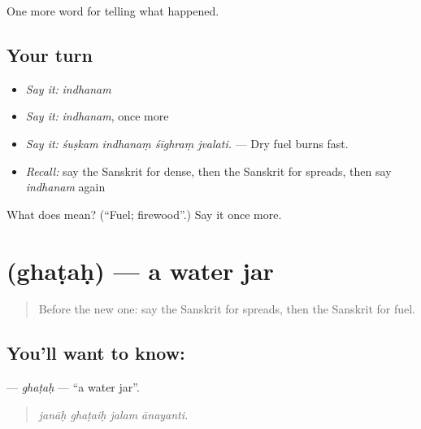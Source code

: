 \begin{grammarlens}[title={What you've built}]
One more word for telling what happened.
\end{grammarlens}

\subsection*{Your turn}
\begin{itemize}
\raggedright
  \item \emph{Say it:} \emph{indhanam}
  \item \emph{Say it:} \emph{indhanam}, once more
  \item \emph{Say it:} \emph{śuṣkam indhanaṃ śīghraṃ jvalati.} — Dry fuel burns fast.
  \item \emph{Recall:} say the Sanskrit for dense, then the Sanskrit for spreads, then say \emph{indhanam} again
\end{itemize}

\begin{tcolorbox}[breakable,colback=teal!4,colframe=teal!35!black,title={Before you move on}]
What does  mean? (\textquotedblleft{}Fuel; firewood\textquotedblright{}.) Say it once more.
\end{tcolorbox}
\section[\texorpdfstring{\sk{घटः} (ghaṭaḥ)}{घटः (ghaṭaḥ)}]{ (ghaṭaḥ) — a water jar}

\label{lesson:SA-C297-ghatah}



\begin{quote}
Before the new one: say the Sanskrit for spreads, then the Sanskrit for fuel.
\end{quote}

\subsection*{You'll want to know: }
\textbf{} — \emph{ghaṭaḥ} — \textquotedblleft{}a water jar\textquotedblright{}.

\begin{quote}
   
\end{quote}

\begin{quote}
\emph{janāḥ ghaṭaiḥ jalam ānayanti.}
\end{quote}

